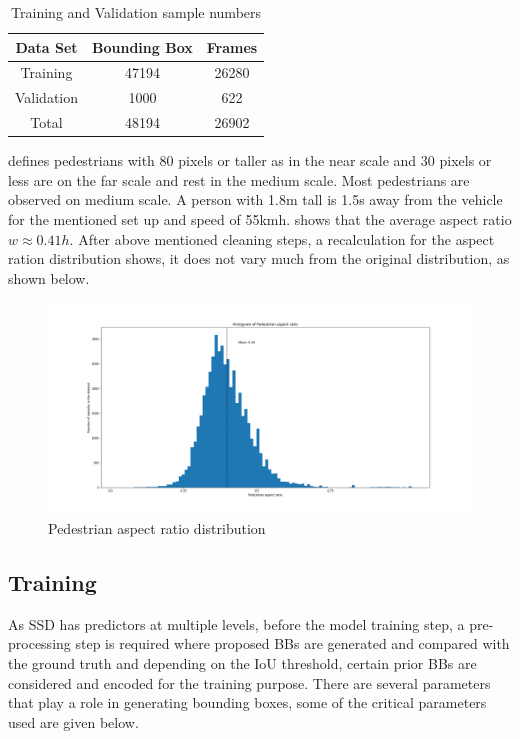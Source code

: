 \begin {table}[H]
\begin{center}
 \begin{tabular}{||c c c||}
 \hline
 Data Set & Bounding Box & Frames\\ [0.8ex] 
 \hline\hline
 Training & 47194 & 26280 \\
 \hline
 Validation & 1000 & 622 \\
 \hline
 Total & 48194 & 26902 \\
 \hline
\end{tabular}
\caption{Training and Validation sample numbers}
\end{center}
\end {table}

\cite{dollar2009pedestrian} defines pedestrians with 80 pixels or taller as in the near scale and 30 pixels or less
are on the far scale and rest in the medium scale. Most pedestrians are observed on medium scale. A person with 1.8m tall is 1.5s away from the vehicle for the mentioned set up and speed of 55km\/h. \cite{dollar2011pedestrian} shows that the average aspect ratio \textit{$w \approx 0.41h$}. After above mentioned cleaning steps, a recalculation for the aspect ration distribution shows, it does not vary much from the original distribution, as shown below.

\begin{figure}[H]
\includegraphics[scale=0.4]{aspect_ratio_distribution}
\begin{center}
\caption{Pedestrian aspect ratio distribution}
\end{center}
\end{figure}

\subsection{Training }
As SSD has predictors at multiple levels, before the model training step, a pre-processing step is required where proposed BBs are generated and compared with the ground truth and depending on the IoU threshold, certain prior BBs are considered and encoded for the training purpose. There are several parameters that play a role in generating bounding boxes, some of the critical parameters used are given below.

